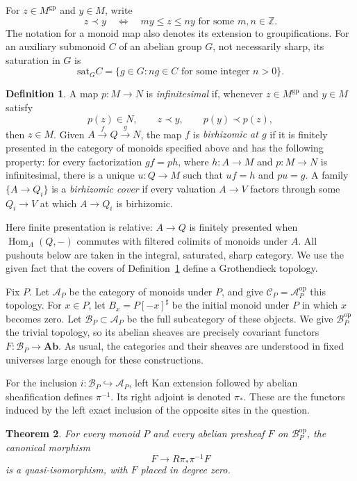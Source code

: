 \documentclass[11pt]{article}
\newtheorem{theorem}{Theorem}[section]
\theoremstyle{definition}
\newtheorem{definition}[theorem]{Definition}
\theoremstyle{remark}
\newcommand{\Z}{\mathbb Z}
\newcommand{\gp}{\mathrm{gp}}
\newcommand{\sat}{\mathrm{sat}}
\newcommand{\Hom}{\operatorname{Hom}}
\newcommand{\Ab}{\mathbf{Ab}}
\newcommand{\cA}{\mathcal A}
\newcommand{\cB}{\mathcal B}
\newcommand{\cC}{\mathcal C}
\begin{document}
For $z\in M^{\gp}$ and $y\in M$, write
\[
 z\prec y\quad\Longleftrightarrow\quad
 my\leq z\leq ny\text{ for some }m,n\in\Z.
\]
The notation for a monoid map also denotes its extension to groupifications. For an auxiliary submonoid $C$ of an abelian group $G$, not necessarily sharp, its saturation in $G$ is
\[
 \sat_G C=\{g\in G:ng\in C\text{ for some integer }n>0\}.
\]

\begin{definition}\label{def:topology}
A map $p:M\to N$ is \emph{infinitesimal} if, whenever $z\in M^{\gp}$ and $y\in M$ satisfy
\[
 p(z)\in N,\qquad z\prec y,\qquad p(y)\prec p(z),
\]
then $z\in M$.
Given $A\xrightarrow{f}Q\xrightarrow{g}N$, the map $f$ is \emph{birhizomic at $g$} if it is finitely presented in the category of monoids specified above and has the following property: for every factorization $gf=ph$, where $h:A\to M$ and $p:M\to N$ is infinitesimal, there is a unique $u:Q\to M$ such that $uf=h$ and $pu=g$.
A family $\{A\to Q_i\}$ is a \emph{birhizomic cover} if every valuation $A\to V$ factors through some $Q_i\to V$ at which $A\to Q_i$ is birhizomic.
\end{definition}

Here finite presentation is relative: $A\to Q$ is finitely presented when $\Hom_A(Q,-)$ commutes with filtered colimits of monoids under $A$. All pushouts below are taken in the integral, saturated, sharp category. We use the given fact that the covers of Definition~\ref{def:topology} define a Grothendieck topology.

Fix $P$. Let $\cA_P$ be the category of monoids under $P$, and give $\cC_P=\cA_P^{\mathrm{op}}$ this topology. For $x\in P$, let $B_x=P[-x]^\sharp$ be the initial monoid under $P$ in which $x$ becomes zero. Let $\cB_P\subset\cA_P$ be the full subcategory of these objects. We give $\cB_P^{\mathrm{op}}$ the trivial topology, so its abelian sheaves are precisely covariant functors $F:\cB_P\to\Ab$. As usual, the categories and their sheaves are understood in fixed universes large enough for these constructions.

For the inclusion $i:\cB_P\hookrightarrow\cA_P$, left Kan extension followed by abelian sheafification defines $\pi^{-1}$. Its right adjoint is denoted $\pi_*$. These are the functors induced by the left exact inclusion of the opposite sites in the question.

\begin{theorem}\label{thm:main}
For every monoid $P$ and every abelian presheaf $F$ on $\cB_P^{\mathrm{op}}$, the canonical morphism
\[
 F\longrightarrow R\pi_*\pi^{-1}F
\]
is a quasi-isomorphism, with $F$ placed in degree zero.
\end{theorem}
\end{document}
